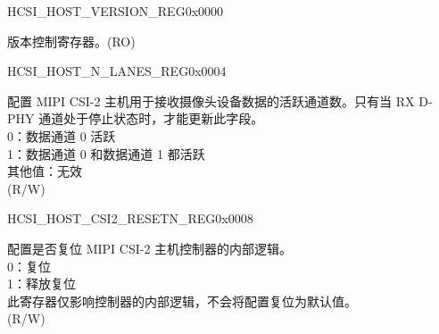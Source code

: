 \begin{register}{H}{CSI\_HOST\_VERSION\_REG}{0x0000}\label{regdesc:CSIHOSTVERSIONREG}
%
\regnewline%
\begin{regdesc}\begin{reglist}
\label{fielddesc:CSIHOSTVERSION}\item [CSI\_HOST\_VERSION] 版本控制寄存器。(RO)
\end{reglist}\end{regdesc}
\end{register}


\begin{register}{H}{CSI\_HOST\_N\_LANES\_REG}{0x0004}\label{regdesc:CSIHOSTNLANESREG}
%
%
\regnewline%
\begin{regdesc}\begin{reglist}
\label{fielddesc:CSIHOSTNLANES}\item [CSI\_HOST\_N\_LANES] 配置 MIPI CSI-2 主机用于接收摄像头设备数据的活跃通道数。只有当 RX D-PHY 通道处于停止状态时，才能更新此字段。\\
0：数据通道 0 活跃 \\
1：数据通道 0 和数据通道 1 都活跃 \\
其他值：无效 \\
(R/W)
\end{reglist}\end{regdesc}
\end{register}


\begin{register}{H}{CSI\_HOST\_CSI2\_RESETN\_REG}{0x0008}\label{regdesc:CSIHOSTCSI2RESETNREG}
%
%
\regnewline%
\begin{regdesc}\begin{reglist}
\label{fielddesc:CSIHOSTCSI2RESETN}\item [CSI\_HOST\_CSI2\_RESETN] 配置是否复位 MIPI CSI-2 主机控制器的内部逻辑。\\
0：复位 \\
1：释放复位\\
此寄存器仅影响控制器的内部逻辑，不会将配置复位为默认值。 \\
(R/W)
\end{reglist}\end{regdesc}
\end{register}


